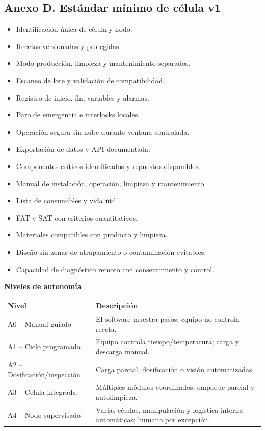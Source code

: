 \documentclass[11pt,a4paper]{article}
\newcommand{\etiqueta}[1]{\par\medskip\noindent\textbf{#1}\par\nopagebreak\smallskip}
\begin{document}
\subsection*{Anexo D. Estándar mínimo de célula v1}
\begin{itemize}
\item Identificación única de célula y nodo.
\item Recetas versionadas y protegidas.
\item Modo producción, limpieza y mantenimiento separados.
\item Escaneo de lote y validación de compatibilidad.
\item Registro de inicio, fin, variables y alarmas.
\item Paro de emergencia e interlocks locales.
\item Operación segura sin nube durante ventana controlada.
\item Exportación de datos y API documentada.
\item Componentes críticos identificados y repuestos disponibles.
\item Manual de instalación, operación, limpieza y mantenimiento.
\item Lista de consumibles y vida útil.
\item FAT y SAT con criterios cuantitativos.
\item Materiales compatibles con producto y limpieza.
\item Diseño sin zonas de atrapamiento o contaminación evitables.
\item Capacidad de diagnóstico remoto con consentimiento y control.
\end{itemize}

\etiqueta{Niveles de autonomía}
{\small
\begin{xltabular}{\textwidth}{@{}P{4.4cm}L@{}}
\toprule
\textbf{Nivel} & \textbf{Descripción}\\ \midrule
A0 -- Manual guiado & El software muestra pasos; equipo no controla receta.\\
A1 -- Ciclo programado & Equipo controla tiempo/temperatura; carga y descarga manual.\\
A2 -- Dosificación/inspección & Carga parcial, dosificación o visión automatizadas.\\
A3 -- Célula integrada & Múltiples módulos coordinados, empaque parcial y autolimpieza.\\
A4 -- Nodo supervisado & Varias células, manipulación y logística interna automáticas; humano por excepción.\\
\bottomrule
\end{xltabular}}
\end{document}
